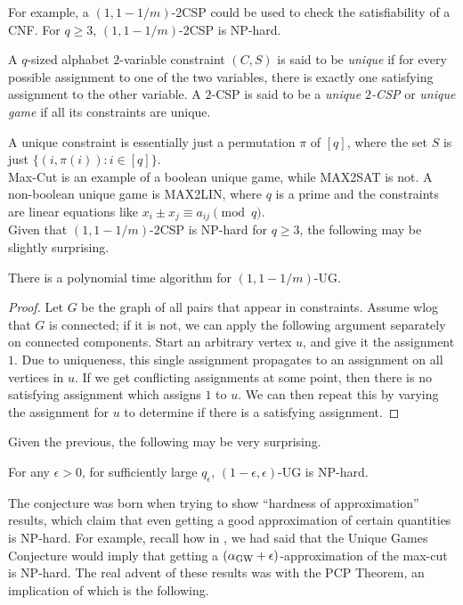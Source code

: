 	For example, a $(1,1-1/m)$-2CSP could be used to check the satisfiability of a CNF. For $q \ge 3$, $(1,1-1/m)$-2CSP is \textsf{NP}-hard.

	\begin{fdef}
		A $q$-sized alphabet $2$-variable constraint $(C,S)$ is said to be \emph{unique} if for every possible assignment to one of the two variables, there is exactly one satisfying assignment to the other variable. A $2$-CSP is said to be a \emph{unique $2$-CSP} or \emph{unique game} if all its constraints are unique. 
	\end{fdef}
	A unique constraint is essentially just a permutation $\pi$ of $[q]$, where the set $S$ is just $\{(i,\pi(i)) : i \in [q]\}$.\\
	Max-Cut is an example of a boolean unique game, while MAX2SAT is not. A non-boolean unique game is MAX2LIN, where $q$ is a prime and the constraints are linear equations like $x_i \pm x_j \equiv a_{ij} \pmod{q}$.\\

	Given that $(1,1-1/m)$-2CSP is NP-hard for $q \ge 3$, the following may be slightly surprising.
	\begin{ftheo}[Propagation]
		There is a polynomial time algorithm for $(1,1-1/m)$-UG.
	\end{ftheo}
	\begin{proof}
		Let $G$ be the graph of all pairs that appear in constraints. Assume wlog that $G$ is connected; if it is not, we can apply the following argument separately on connected components. Start an arbitrary vertex $u$, and give it the assignment $1$. Due to uniqueness, this single assignment propagates to an assignment on all vertices in $u$. If we get conflicting assignments at some point, then there is no satisfying assignment which assigns $1$ to $u$. We can then repeat this by varying the assignment for $u$ to determine if there is a satisfying assignment. 
	\end{proof}

	Given the previous, the following may be very surprising.
	\begin{fcon}
		For any $\epsilon > 0$, for sufficiently large $q_{\epsilon}$, $(1-\epsilon,\epsilon)$-UG is \textsf{NP}-hard.
	\end{fcon}
	The conjecture was born when trying to show ``hardness of approximation'' results, which claim that even getting a good approximation of certain quantities is \textsf{NP}-hard. For example, recall how in , we had said that the Unique Games Conjecture would imply that getting a $(\alpha_{\text{GW}}+\epsilon)$-approximation of the max-cut is \textsf{NP}-hard. The real advent of these results was with the PCP Theorem, an implication of which is the following.

